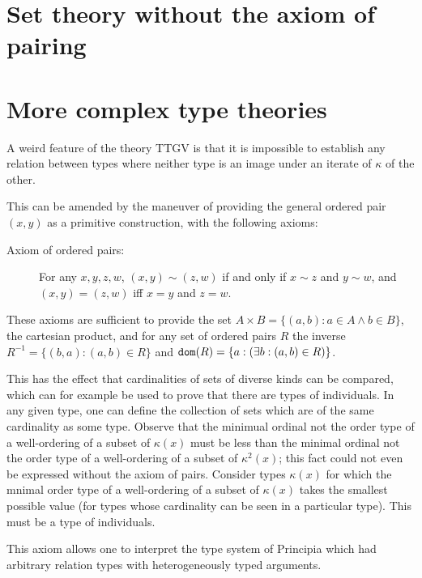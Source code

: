 \documentclass[12pt]{article}
\begin{document}
\section{Set theory without the axiom of pairing}


\section{More complex type theories}

A weird feature of the theory TTGV is that it is impossible to establish any relation between types where neither type is an image under an iterate of $\kappa$ of the other.

This can be amended by the maneuver of providing the general ordered pair $(x,y)$ as a primitive construction, with the following axioms:

\begin{description}

\item[Axiom of ordered pairs:]  For any $x,y,z,w$, $(x,y) \sim (z,w)$ if and only if $x \sim z$ and $y\sim w$, and
$(x,y)=(z,w)$ iff $x=y$ and $z=w$.

\end{description}

These axioms are sufficient to provide the set $A \times B = \{(a,b):a \in A \wedge b \in B\}$, the cartesian product,
and for any set of ordered pairs $R$ the inverse $R^{-1} = \{(b,a):(a,b)\in R\}$ and ${\tt dom}(R) = \{a:(\exists b:(a,b)\in R)\}$.

This has the effect that cardinalities of sets of diverse kinds can be compared, which can for example be used to prove that there are types of individuals.  In any given type, one can define the collection of sets which are of the same cardinality as some type.  Observe that the minimual ordinal not the order type of a well-ordering of a subset of $\kappa(x)$ must be less than the minimal ordinal not the order type of a well-ordering of a subset of $\kappa^2(x)$;  this fact could not even be expressed without the axiom of pairs.  Consider  types $\kappa(x)$ for which the mnimal order type of a well-ordering of a subset of $\kappa(x)$ takes the smallest possible value (for types whose cardinality can be seen in a particular type).  This must be a type of individuals.

This axiom allows one to interpret the type system of Principia which had arbitrary relation types with heterogeneously typed arguments.
\end{document}
